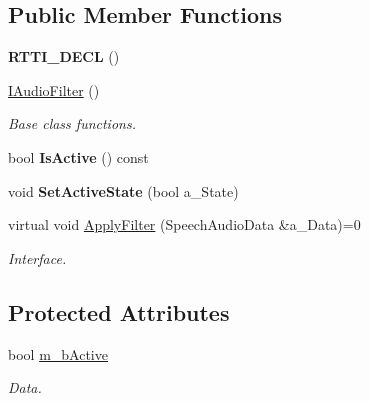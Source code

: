 \subsection*{Public Member Functions}
\begin{DoxyCompactItemize}
\item 
\mbox{\label{class_text_extractor_1_1_i_audio_filter_adae24812eb8187c0a17491450319ea90}} 
{\bfseries R\+T\+T\+I\+\_\+\+D\+E\+CL} ()
\item 
\mbox{\label{class_text_extractor_1_1_i_audio_filter_a9c6a14ed9f149263b65147113c934096}} 
\hyperlink{class_text_extractor_1_1_i_audio_filter_a9c6a14ed9f149263b65147113c934096}{I\+Audio\+Filter} ()
\begin{DoxyCompactList}\small\item\em Base class functions. \end{DoxyCompactList}\item 
\mbox{\label{class_text_extractor_1_1_i_audio_filter_a2133f26fb0d79faa2f774f35a788fca8}} 
bool {\bfseries Is\+Active} () const
\item 
\mbox{\label{class_text_extractor_1_1_i_audio_filter_af57bc63637f1928bd7821d7c6d8ac6de}} 
void {\bfseries Set\+Active\+State} (bool a\+\_\+\+State)
\item 
\mbox{\label{class_text_extractor_1_1_i_audio_filter_aa5be454fb207c6f6634eff60b33968d0}} 
virtual void \hyperlink{class_text_extractor_1_1_i_audio_filter_aa5be454fb207c6f6634eff60b33968d0}{Apply\+Filter} (Speech\+Audio\+Data \&a\+\_\+\+Data)=0
\begin{DoxyCompactList}\small\item\em Interface. \end{DoxyCompactList}\end{DoxyCompactItemize}
\subsection*{Protected Attributes}
\begin{DoxyCompactItemize}
\item 
\mbox{\label{class_text_extractor_1_1_i_audio_filter_aa7803b507e0cd6b915fc6b24e137410c}} 
bool \hyperlink{class_text_extractor_1_1_i_audio_filter_aa7803b507e0cd6b915fc6b24e137410c}{m\+\_\+b\+Active}
\begin{DoxyCompactList}\small\item\em Data. \end{DoxyCompactList}\end{DoxyCompactItemize}


